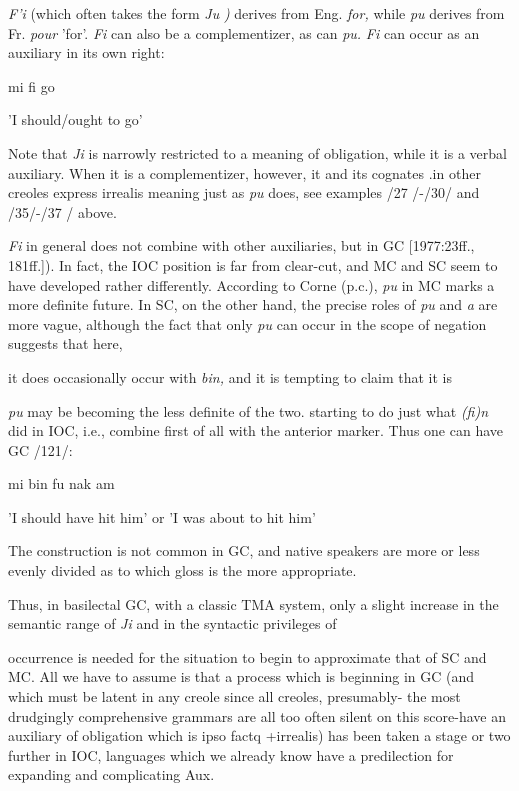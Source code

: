 \textit{F'i} (which often takes the form \textit{Ju} \textit{)} derives from Eng. \textit{for,} while \textit{pu} derives from Fr. \textit{pour} 'for'. \textit{Fi} can also be a complementizer, as can \textit{pu.} \textit{Fi} can occur as an auxiliary in its own right:

\ea\label{ex:120}
 mi fi go

'I should/ought to go'
\glt
\z


Note that \textit{Ji} is narrowly restricted to a meaning of obligation, while it is a verbal auxiliary. When it is a complementizer, however, it and its cognates .in other creoles express irrealis meaning just as \textit{pu} does, see examples /27 /-/30/ and /35/-/37 / above.

\textit{Fi} in general does not combine with other auxiliaries, but in GC
[1977:23ff., 181ff.]). In fact, the IOC position is far from clear-cut, and MC and SC seem to have developed rather differently. According to Corne (p.c.), \textit{pu} in MC marks a more definite future. In SC, on the other hand, the precise roles of \textit{pu} and \textit{a }are more vague, although the fact that only \textit{pu} can occur in the scope of negation suggests that here,

it does occasionally occur with \textit{bin,} and it is tempting to claim that it is

\textit{pu} may be becoming the less definite of the two.
starting to do just what \textit{(fi)n} did in IOC, i.e., combine first of all with the anterior marker. Thus one can have GC /121/:

\ea\label{ex:121}
 mi bin fu nak am
\glt
\z

'I should have hit him' or 'I was about to hit him'

The construction is not common in GC, and native speakers are more or less evenly divided as to which gloss is the more appropriate.

Thus, in basilectal GC, with a classic TMA system, only a slight increase in the semantic range of \textit{Ji} and in the syntactic privileges of

occurrence is needed for the situation to begin to approximate that of SC and MC. All we have to assume is that a process which is begin\-ning in GC (and which must be latent in any creole since all creoles, presumably- the most drudgingly comprehensive grammars are all too often silent on this score-have an auxiliary of obligation which is ipso factq +irrealis) has been taken a stage or two further in IOC, languages which we already know have a predilection for expanding and complicating Aux.

